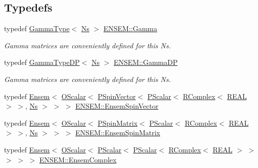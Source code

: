 \subsection*{Typedefs}
\begin{DoxyCompactItemize}
\item 
typedef \mbox{\hyperlink{classENSEM_1_1GammaType}{Gamma\+Type}}$<$ \mbox{\hyperlink{namespaceENSEM_a6f05e048f9b2eb1a19131074f8abc25f}{Ns}} $>$ \mbox{\hyperlink{group__defs_ga0cf937e0a1681829b6b69762c6b8427b}{E\+N\+S\+E\+M\+::\+Gamma}}
\begin{DoxyCompactList}\small\item\em Gamma matrices are conveniently defined for this Ns. \end{DoxyCompactList}\item 
typedef \mbox{\hyperlink{classENSEM_1_1GammaTypeDP}{Gamma\+Type\+DP}}$<$ \mbox{\hyperlink{namespaceENSEM_a6f05e048f9b2eb1a19131074f8abc25f}{Ns}} $>$ \mbox{\hyperlink{group__defs_ga318782f1c57403a3bb07a1f4e15345c9}{E\+N\+S\+E\+M\+::\+Gamma\+DP}}
\begin{DoxyCompactList}\small\item\em Gamma matrices are conveniently defined for this Ns. \end{DoxyCompactList}\item 
typedef \mbox{\hyperlink{classENSEM_1_1Ensem}{Ensem}}$<$ \mbox{\hyperlink{classENSEM_1_1OScalar}{O\+Scalar}}$<$ \mbox{\hyperlink{classENSEM_1_1PSpinVector}{P\+Spin\+Vector}}$<$ \mbox{\hyperlink{classENSEM_1_1PScalar}{P\+Scalar}}$<$ \mbox{\hyperlink{classENSEM_1_1RComplex}{R\+Complex}}$<$ \mbox{\hyperlink{namespaceENSEM_a6dd9aa6508168f545c861787e63ddd1e}{R\+E\+AL}} $>$ $>$, \mbox{\hyperlink{namespaceENSEM_a6f05e048f9b2eb1a19131074f8abc25f}{Ns}} $>$ $>$ $>$ \mbox{\hyperlink{group__defs_gac817a4995f4c9a955aa536e3e9879184}{E\+N\+S\+E\+M\+::\+Ensem\+Spin\+Vector}}
\item 
typedef \mbox{\hyperlink{classENSEM_1_1Ensem}{Ensem}}$<$ \mbox{\hyperlink{classENSEM_1_1OScalar}{O\+Scalar}}$<$ \mbox{\hyperlink{classENSEM_1_1PSpinMatrix}{P\+Spin\+Matrix}}$<$ \mbox{\hyperlink{classENSEM_1_1PScalar}{P\+Scalar}}$<$ \mbox{\hyperlink{classENSEM_1_1RComplex}{R\+Complex}}$<$ \mbox{\hyperlink{namespaceENSEM_a6dd9aa6508168f545c861787e63ddd1e}{R\+E\+AL}} $>$ $>$, \mbox{\hyperlink{namespaceENSEM_a6f05e048f9b2eb1a19131074f8abc25f}{Ns}} $>$ $>$ $>$ \mbox{\hyperlink{group__defs_gafa28f0d9727eaa39fea6e3089c22ba33}{E\+N\+S\+E\+M\+::\+Ensem\+Spin\+Matrix}}
\item 
typedef \mbox{\hyperlink{classENSEM_1_1Ensem}{Ensem}}$<$ \mbox{\hyperlink{classENSEM_1_1OScalar}{O\+Scalar}}$<$ \mbox{\hyperlink{classENSEM_1_1PScalar}{P\+Scalar}}$<$ \mbox{\hyperlink{classENSEM_1_1PScalar}{P\+Scalar}}$<$ \mbox{\hyperlink{classENSEM_1_1RComplex}{R\+Complex}}$<$ \mbox{\hyperlink{namespaceENSEM_a6dd9aa6508168f545c861787e63ddd1e}{R\+E\+AL}} $>$ $>$ $>$ $>$ $>$ \mbox{\hyperlink{group__defs_ga5d1497403fdbca6ecdeec3d05de9a223}{E\+N\+S\+E\+M\+::\+Ensem\+Complex}}

\end{DoxyCompactItemize}
